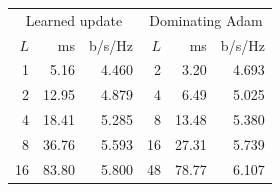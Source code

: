 \begin{tabular}{rrr|rrr}
\toprule
\multicolumn{3}{c|}{Learned update} & \multicolumn{3}{c}{Dominating Adam} \\
$L$ & ms & b/s/Hz & $L$ & ms & b/s/Hz \\
\midrule
1 & 5.16 & 4.460 & 2 & 3.20 & 4.693 \\
2 & 12.95 & 4.879 & 4 & 6.49 & 5.025 \\
4 & 18.41 & 5.285 & 8 & 13.48 & 5.380 \\
8 & 36.76 & 5.593 & 16 & 27.31 & 5.739 \\
16 & 83.80 & 5.800 & 48 & 78.77 & 6.107 \\
\bottomrule
\end{tabular}
